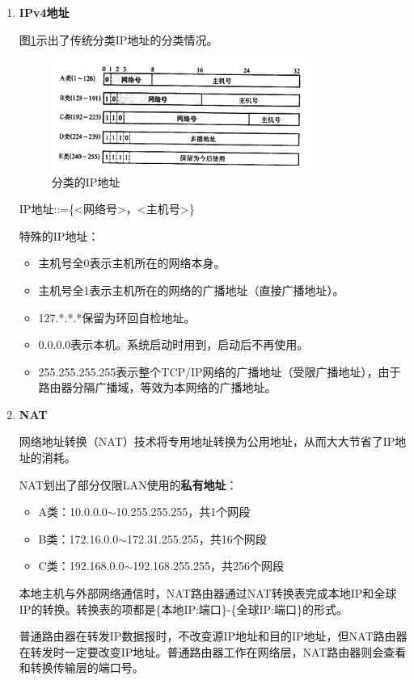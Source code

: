 \documentclass[12pt, a4paper, oneside]{ctexart}
\begin{document}
\begin{enumerate}
    \item {\bf IPv4地址}
    
    图\ref{ip_classes}示出了传统分类IP地址的分类情况。

    \begin{figure}[h]
        \centering
        \includegraphics[width=0.8\textwidth]{./images/ip_address.png}
        \caption{分类的IP地址}
        \label{ip_classes}
    \end{figure}
    
    IP地址::=\{<网络号>，<主机号>\}
    
    特殊的IP地址：
    \begin{itemize}
        \item 主机号全0表示主机所在的网络本身。
        \item 主机号全1表示主机所在的网络的广播地址（直接广播地址）。
        \item 127.*.*.*保留为环回自检地址。
        \item 0.0.0.0表示本机。系统启动时用到，启动后不再使用。
        \item 255.255.255.255表示整个TCP/IP网络的广播地址（受限广播地址），由于路由器分隔广播域，等效为本网络的广播地址。
    \end{itemize}

    \item {\bf NAT}
    
    网络地址转换（NAT）技术将专用地址转换为公用地址，从而大大节省了IP地址的消耗。

    NAT划出了部分仅限LAN使用的\textbf{私有地址}：
    \begin{itemize}
        \item A类：10.0.0.0$\sim$10.255.255.255，共1个网段
        \item B类：172.16.0.0$\sim$172.31.255.255，共16个网段
        \item C类：192.168.0.0$\sim$192.168.255.255，共256个网段
    \end{itemize}

    本地主机与外部网络通信时，NAT路由器通过NAT转换表完成本地IP和全球IP的转换。转换表的项都是\{本地IP:端口\}-\{全球IP:端口\}的形式。
    
    普通路由器在转发IP数据报时，不改变源IP地址和目的IP地址，但NAT路由器在转发时一定要改变IP地址。普通路由器工作在网络层，NAT路由器则会查看和转换传输层的端口号。
\end{enumerate}
\end{document}
